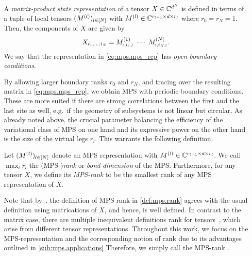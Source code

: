 \begin{definition}%
  \label{def:mps.mps}
  A \emph{matrix-product state representation} of a tensor $X \in {\mathbb{C}}^{d^N}$ is defined in terms of a tuple of local tensors $(M^{(l)})_{l \in [N]}$ with $M^{(l)} \in {\mathbb{C}}^{r_{l - 1} \times d \times r_l}$ where $r_0 = r_N = 1$.
  Then, the components of $X$ are given by
  \[
    \label{eq:mps.mps_rep}
    X_{i_1,\ldots,i_N} = M\ind{1}_{:,i_1,:}\ \cdots\  M\ind{N}_{:,i_N,:}.
  \]
  We say that the representation in \cref{eq:mps.mps_rep} has \emph{open boundary conditions}.
\end{definition}

By allowing larger boundary ranks $r_0$ and $r_N$, and tracing over the resulting matrix in \cref{eq:mps.mps_rep}, we obtain MPS with periodic boundary conditions.
These are more suited if there are strong correlations between the first and the last site as well, e.g.\ if the geometry of subsystems is not linear but circular.
As already noted above, the crucial parameter balancing the efficiency of the variational class of MPS on one hand and its expressive power on the other hand is the size of the virtual legs $r_l$.
This warrants the following definition.

\begin{definition}%
  \label{def:mps.rank}
  Let $(M^{(l)})_{l \in [N]}$ denote an MPS representation with $M^{(l)} \in {\mathbb{C}}^{r_{l - 1} \times d \times r_l}$.
  We call $\max_l r_l$ the (MPS-)\emph{rank} or \emph{bond dimension} of the MPS.
  Furthermore, for any tensor $X$, we define its \emph{MPS-rank} to be the smallest rank of any MPS representation of $X$.
\end{definition}

Note that by~\cite[Thm.\ 2.2]{Oseledets_2011_TensorTrain}, the definition of MPS-rank in \cref{def:mps.rank} agrees with the usual definition using matrications of $X$, and hence, is well defined.
In contrast to the matrix case, there are multiple inequivalent definitions rank for tensors~\cite{Kolda_2009_Tensor}, which arise from different tensor representations.
Throughout this work, we focus on the MPS-representation and the corresponding notion of rank due to its advantages outlined in \cref{sub:mps.applications}
Therefore, we simply call the MPS-rank .\\



